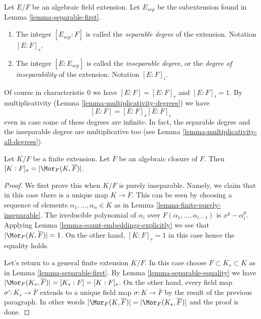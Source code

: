 \begin{definition}
\label{definition-insep-degree}
Let $E/F$ be an algebraic field extension. Let $E_{sep}$ be the subextension
found in Lemma \ref{lemma-separable-first}.
\begin{enumerate}
\item The integer $[E_{sep} : F]$ is called the {\it separable
degree} of the extension. Notation $[E : F]_s$.
\item The integer $[E : E_{sep}]$ is called the {\it inseparable
degree}, or the {\it degree of inseparability} of the extension.
Notation $[E : F]_i$.
\end{enumerate}
\end{definition}

\noindent
Of course in characteristic $0$ we have $[E : F] = [E : F]_s$ and
$[E : F]_i = 1$. By multiplicativity
(Lemma \ref{lemma-multiplicativity-degrees}) we have
$$
[E : F] = [E : F]_s [E : F]_i
$$
even in case some of these degrees are infinite. In fact, the separable
degree and the inseparable degree are multiplicative too (see
Lemma \ref{lemma-multiplicativity-all-degrees}).

\begin{lemma}
\label{lemma-separable-degree}
Let $K/F$ be a finite extension. Let $\overline{F}$ be an algebraic
closure of $F$. Then $[K : F]_s = |\Mor_F(K, \overline{F})|$.
\end{lemma}

\begin{proof}
We first prove this when $K/F$ is purely inseparable. Namely, we claim that
in this case there is a unique map $K \to \overline{F}$. This can be
seen by choosing a sequence of elements $\alpha_1, \ldots, \alpha_n \in K$
as in Lemma \ref{lemma-finite-purely-inseparable}. The irreducible polynomial
of $\alpha_i$ over $F(\alpha_1, \ldots, \alpha_{i - 1})$ is $x^p - \alpha_i^p$.
Applying Lemma \ref{lemma-count-embeddings-explicitly} we see that
$|\Mor_F(K, \overline{F})| = 1$. On the other hand, $[K : F]_s = 1$
in this case hence the equality holds.

\medskip\noindent
Let's return to a general finite extension $K/F$. In this case
choose $F \subset K_s \subset K$ as in Lemma \ref{lemma-separable-first}.
By Lemma \ref{lemma-separable-equality} we have
$|\Mor_F(K_s, \overline{F})| = [K_s : F] = [K : F]_s$.
On the other hand, every field map $\sigma' : K_s \to \overline{F}$
extends to a unique field map $\sigma : K \to \overline{F}$ by the
result of the previous paragraph. In other words
$|\Mor_F(K, \overline{F})| = |\Mor_F(K_s, \overline{F})|$
and the proof is done.
\end{proof}

